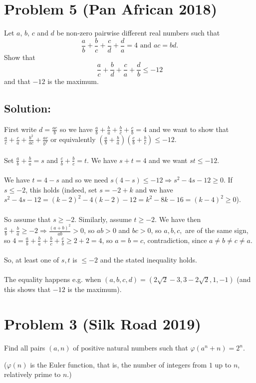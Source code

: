 \documentclass[11pt, a4paper, oneside]{article}
\newcommand{\problem}[1][]{\section{#1} \hfill \par}
\newcommand{\solution}[1][]{\subsection*{#1}\hfill \par}
\theoremstyle{remark}
\theoremstyle{lemma}
\begin{document}
\newpage
\problem[Problem 5 (Pan African 2018)]
Let $a$, $b$, $c$ and $d$ be non-zero pairwise different real numbers such that
$$
  \frac{a}{b} + \frac{b}{c} + \frac{c}{d} + \frac{d}{a} = 4 \text{ and } ac = bd.
$$
Show that
$$
  \frac{a}{c} + \frac{b}{d} + \frac{c}{a} + \frac{d}{b} \leq -12
$$and that $-12$ is the maximum.
\solution[Solution:]
First write $d=\frac{ac}{b}$ so we have $\frac{a}{b}+\frac{b}{a}+\frac{b}{c}+\frac{c}{b}=4$ and we want to show that $\frac{a}{c}+\frac{c}{a}+\frac{b^2}{ac}+\frac{ac}{b^2}$ or equivalently $(\frac{a}{b}+\frac{b}{a})(\frac{c}{b}+\frac{b}{c}) \leqslant -12$.
\\\\
Set $\frac{a}{b}+\frac{b}{a}=s$ and $\frac{c}{b}+\frac{b}{c}=t$. We have $s+t=4$ and we want $st \leqslant -12$.
\\\\
We have $t=4-s$ and so we need $s(4-s) \leqslant -12 \Rightarrow s^2-4s-12 \geqslant 0$. If $s \leqslant -2$, this holds (indeed, set $s=-2+k$ and we have $s^2-4s-12=(k-2)^2-4(k-2)-12=k^2-8k-16=(k-4)^2 \geqslant 0$).
\\\\
So assume that $s \geqslant -2$. Similarly, assume $t \geqslant -2$. We have then $\frac{a}{b}+\frac{b}{a} \geqslant -2 \Rightarrow \frac{(a+b)^2}{ab}>0$, so $ab>0$ and $bc>0$, so $a,b,c,$ are of the same sign, so $4=\frac{a}{b}+\frac{b}{a}+\frac{b}{c}+\frac{c}{b} \geqslant 2+2=4$, so $a=b=c$, contradiction, since $a \neq b \neq c \neq a$.
\\\\
So, at least one of $s,t$ is $\leqslant -2$ and the stated inequality holds.
\\\\
The equality happens e.g. when $(a,b,c,d)=(2\sqrt{2}-3,3-2\sqrt{2},1,-1)$ (and this shows that $-12$ is the maximum).
\newpage
\problem[Problem 3 (Silk Road 2019)]
Find all pairs \( (a, n) \) of positive natural numbers such that \( \varphi \left( a^n + n \right) = 2^n \).

(\( \varphi(n) \) is the Euler function, that is, the number of integers from \(1\) up to \( n \), relatively prime to \( n \).)
\end{document}
